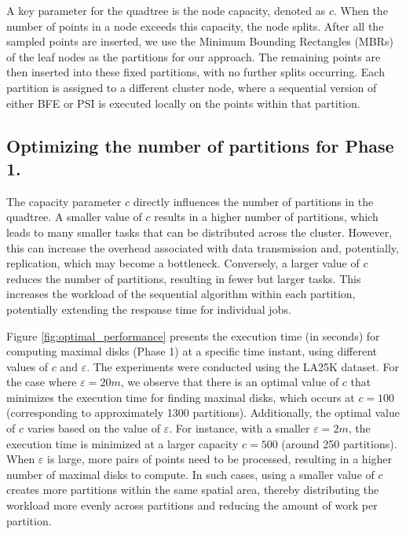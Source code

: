 A key parameter for the quadtree is the node capacity, denoted as $c$. When the number of points in a node exceeds this capacity, the node splits. After all the sampled points are inserted, we use the Minimum Bounding Rectangles (MBRs) of the leaf nodes as the partitions for our approach. The remaining points are then inserted into these fixed partitions, with no further splits occurring. Each partition is assigned to a different cluster node, where a sequential version of either BFE or PSI is executed locally on the points within that partition.

\subsection{Optimizing the number of partitions for Phase 1.}
The capacity parameter $c$ directly influences the number of partitions in the quadtree. A smaller value of $c$ results in a higher number of partitions, which leads to many smaller tasks that can be distributed across the cluster. However, this can increase the overhead associated with data transmission and, potentially, replication, which may become a bottleneck. Conversely, a larger value of $c$ reduces the number of partitions, resulting in fewer but larger tasks. This increases the workload of the sequential algorithm within each partition, potentially extending the response time for individual jobs.

Figure \ref{fig:optimal_performance} presents the execution time (in seconds) for computing maximal disks (Phase 1) at a specific time instant, using different values of $c$ and $\varepsilon$. The experiments were conducted using the LA25K dataset.
For the case where $\varepsilon = 20m$, we observe that there is an optimal value of $c$ that minimizes the execution time for finding maximal disks, which occurs at $c = 100$ (corresponding to approximately 1300 partitions). Additionally, the optimal value of $c$ varies based on the value of $\varepsilon$. For instance, with a smaller $\varepsilon = 2m$, the execution time is minimized at a larger capacity $c = 500$ (around 250 partitions).
When $\varepsilon$ is large, more pairs of points need to be processed, resulting in a higher number of maximal disks to compute. In such cases, using a smaller value of $c$ creates more partitions within the same spatial area, thereby distributing the workload more evenly across partitions and reducing the amount of work per partition.

